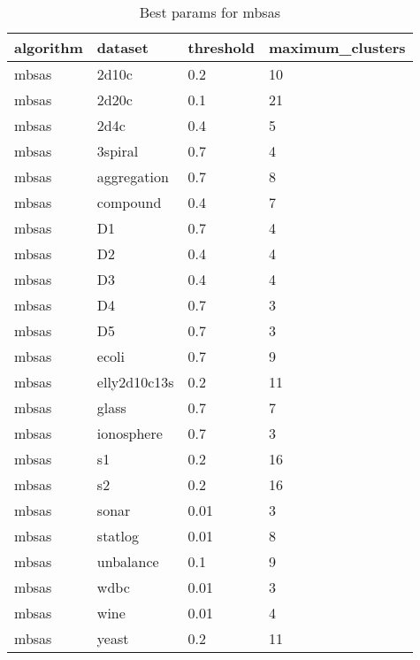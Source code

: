 \begin{table}[H]
\centering
\caption{Best params for mbsas}
\label{tab:params:mbsas}
\begin{tabular}{|l|l|l|l|}
\hline
algorithm & dataset & threshold & maximum\_clusters \\
\hline
mbsas & 2d10c & 0.2 & 10 \\
\hline
mbsas & 2d20c & 0.1 & 21 \\
\hline
mbsas & 2d4c & 0.4 & 5 \\
\hline
mbsas & 3spiral & 0.7 & 4 \\
\hline
mbsas & aggregation & 0.7 & 8 \\
\hline
mbsas & compound & 0.4 & 7 \\
\hline
mbsas & D1 & 0.7 & 4 \\
\hline
mbsas & D2 & 0.4 & 4 \\
\hline
mbsas & D3 & 0.4 & 4 \\
\hline
mbsas & D4 & 0.7 & 3 \\
\hline
mbsas & D5 & 0.7 & 3 \\
\hline
mbsas & ecoli & 0.7 & 9 \\
\hline
mbsas & elly2d10c13s & 0.2 & 11 \\
\hline
mbsas & glass & 0.7 & 7 \\
\hline
mbsas & ionosphere & 0.7 & 3 \\
\hline
mbsas & s1 & 0.2 & 16 \\
\hline
mbsas & s2 & 0.2 & 16 \\
\hline
mbsas & sonar & 0.01 & 3 \\
\hline
mbsas & statlog & 0.01 & 8 \\
\hline
mbsas & unbalance & 0.1 & 9 \\
\hline
mbsas & wdbc & 0.01 & 3 \\
\hline
mbsas & wine & 0.01 & 4 \\
\hline
mbsas & yeast & 0.2 & 11 \\
\hline
\end{tabular}
\end{table}